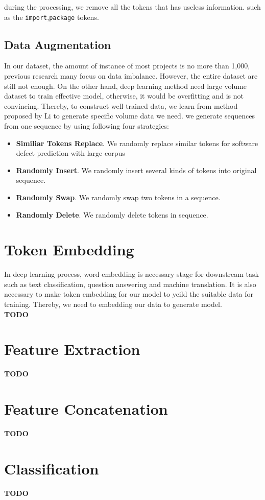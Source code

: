 during the processing, we remove all the tokens that has useless information. such as the \texttt{import},\texttt{package} tokens.
\subsection{Data Augmentation}
In our dataset, the amount of instance of most projects is no more than 1,000, previous research many focus on data imbalance. However, the entire dataset are still not enough. On the other hand, deep learning method need large volume dataset to train effective model, otherwise, it would be overfitting and is not convincing. Thereby, to construct well-trained data, we learn from method proposed by Li \cite{} to generate specific volume data we need. we generate sequences from one sequence by using following four strategies:
\begin{itemize}
    \item \textbf{Similiar Tokens Replace}. We randomly replace similar tokens for software defect prediction with large corpus 
    \item \textbf{Randomly Insert}. We randomly insert several kinds of tokens into original sequence.
    \item \textbf{Randomly Swap}. We randomly swap two tokens in a sequence.
    \item \textbf{Randomly Delete}. We randomly delete tokens in sequence. 
\end{itemize}

\section{Token Embedding}
In deep learning process, word embedding is necessary stage for downstream task such as text classification, question answering and machine translation. It is also necessary to make token embedding for our model to yeild the suitable data for training. Thereby, we need to embedding our data to generate model. \\
\textbf{TODO}

\section{Feature Extraction}
\textbf{TODO}
\section{Feature Concatenation}
\textbf{TODO}
\section{Classification}
\textbf{TODO}